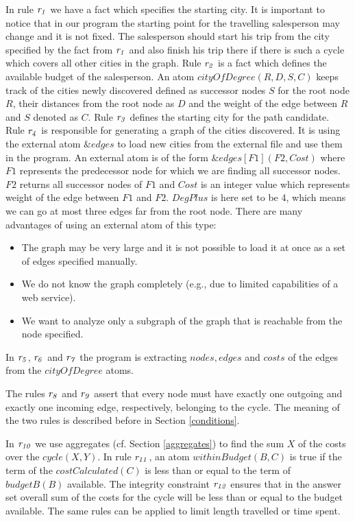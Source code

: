 \documentclass[a4paper, titlepage]{article}
\newcommand{\ext}[3]{\ensuremath{\&{#1}[#2](#3)}}
\newcommand{\row}[1]{%
  \ensuremath{\it \color{black} #1 \color{black}}%
}
\begin{document}
In rule $\row{r_1}$ we have a fact which specifies the starting 
city. 
It is important to notice that in our program the starting 
point for the travelling salesperson may change and it is not 
fixed. The salesperson should start his trip from the 
city specified by the fact from $\row{r_1}$ and also finish 
his trip there if there is such a cycle which covers all 
other cities in the graph. Rule $\row{r_2}$ is a fact which defines the 
available budget of the salesperson. An atom $\mathit{cityOfDegree(R,D,S,C)}$ keeps 
track of the cities newly discovered defined as successor 
nodes $S$ for the root node $R$, their distances from the 
root node as $D$ and the weight of the edge between $R$ and $S$ 
denoted as $C$. Rule $\row{r_3}$ defines the starting city for 
the path candidate. Rule $\row{r_4}$ is responsible for 
generating a graph of 
the cities discovered. It is using the external atom 
$\mathit{\&edges}$ to load new cities from the external 
file and use them in the program. An external atom is of 
the form $\ext{edges}{F1}{F2,Cost}$ where $\mathit{F1}$ 
represents the predecessor node for which we are finding 
all successor 
nodes. $\mathit{F2}$ returns all successor nodes of 
$\mathit{F1}$ and $\mathit{Cost}$ is an integer value which 
represents weight of the edge between $\mathit{F1}$ and 
$\mathit{F2}$. $\mathit{DegPlus}$ is here set to be 4, which means we can go at most three edges far from the root node. 
There are many advantages of using an external atom of this
type:
\begin{itemize}
\item The graph may be very large and it is not possible to load it 
at once as a set of edges specified manually.
\item We do not know the graph completely (e.g., due to limited capabilities of a web service).
\item We want to analyze only a subgraph of the graph that is 
reachable from the node specified.
\end{itemize}    
In $\row{r_5}$, $\row{r_6}$ and $\row{r_7}$ the program is extracting 
$\mathit{nodes}, \mathit{edges}$ and $\mathit{costs}$ of 
the edges from the $\mathit{cityOfDegree}$ atoms. 

The rules $\row{r_8}$ and $\row{r_9}$ assert that every 
node must have exactly one outgoing and exactly one 
incoming edge, respectively, belonging to the cycle. The meaning of the two rules is described before in Section 
\ref{conditions}.

In $\row{r_{10}}$ we use aggregates (cf. Section 
\ref{aggregates}) to find the sum $X$ of the costs over the 
$\mathit{cycle(X,Y)}$. In rule $\row{r_{11}}$, an atom 
$\mathit{withinBudget(B,C)}$ is true if the term of the 
$\mathit{costCalculated(C)}$ is less than or equal to the 
term of $\mathit{budgetB(B)}$ available. The integrity 
constraint $\row{r_{12}}$ ensures that in the answer 
set overall sum of the costs for the cycle will be less 
than or equal to the budget available. The same rules can be applied to limit length travelled or time spent.
\end{document}
